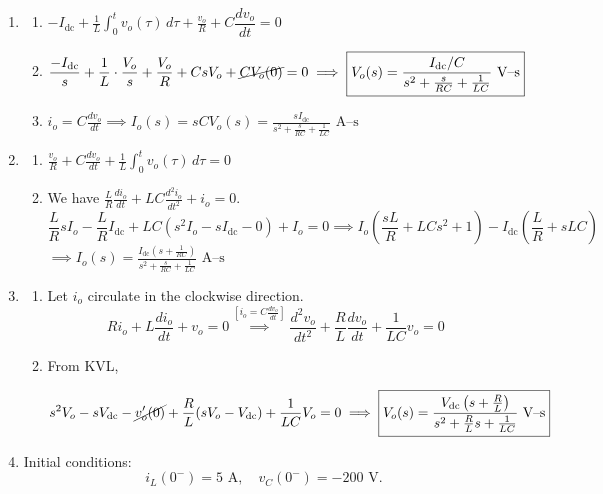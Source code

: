 \documentclass[11pt]{article}
\begin{document}
\begin{enumerate}[leftmargin=*,label=\textbf{3.\arabic*.}]

\item \begin{enumerate}[leftmargin=*,label=\textbf{\alph*.}]
\item $\displaystyle\boxed{-I_\text{dc}+\frac1L\int_0^tv_o(\tau)\,d\tau+\frac{v_o}R+C\dfrac{dv_o}{dt}=0}$
\item $\displaystyle\frac{-I_\text{dc}}s+\frac1L\cdot\frac{V_o}s+\frac{V_o}R+CsV_o+\cancel{CV_o( 0)}=0\implies\boxed{V_o(s)=\frac{I_\text{dc}/C}{s^2+\frac s{RC}+\frac1{LC}}\text{ V--s}}$
\item $\displaystyle i_o=C\frac{dv_o}{dt}\implies\boxed{I_o(s)=sCV_o(s)=\frac{sI_\text{dc}}{s^2+\frac s{RC}+\frac1{LC}} \text{ A--s}}$
\end{enumerate}

\item \begin{enumerate}[leftmargin=*,label=\textbf{\alph*.}]
\item $\displaystyle\boxed{\frac{v_o}R+C\frac{dv_o}{dt}+\frac1L\int_0^tv_o(\tau)\,d\tau=0}$
\item We have $\displaystyle\frac LR\frac{di_o}{dt}+LC\frac{d^2i_o}{dt^2}+i_o=0$.
\[\frac LRsI_o-\frac LRI_\text{dc}+LC(s^2I_o-sI_\text{dc}-0)+I_o=0\implies I_o\left(\frac{sL}R+LCs^2+1\right)-I_\text{dc}\left(\frac LR +sLC\right)\]
$\implies\boxed{I_o(s)=\frac{I_\text{dc}\left(s+\frac1{RC}\right)}{s^2+\frac s{RC}+\frac1{LC}}\text{ A--s}}$
\end{enumerate}

\item \begin{enumerate}[leftmargin=*,label=\textbf{\alph*.}]
\item Let $i_o$ circulate in the clockwise direction.
\[Ri_o+L\dfrac{di_o}{dt}+v_o=0\overset{\displaystyle\left[i_o=C\frac{dv_o}{dt}\right]}{\implies}\boxed{\dfrac{d^2v_o}{dt^2}+\dfrac RL\dfrac{dv_o}{dt}+\dfrac{1}{LC}v_o=0}\]
\item From KVL,

\[s^2V_o-sV_\text{dc}-\cancel{v'_o(0)}+\dfrac{R}{L}(sV_o-V_\text{dc})+\dfrac1{LC}V_o=0\implies\boxed{V_o(s)=\dfrac{V_\text{dc}\left(s+\frac RL\right)}{s^2+\frac RLs+\frac1{LC}}\text{ V--s}}\]

\end{enumerate}

\item Initial conditions:
\[i_L(0^-)=5\text{ A},\quad v_C(0^-)=-200\text{ V}.\]


\end{enumerate}
\end{document}
